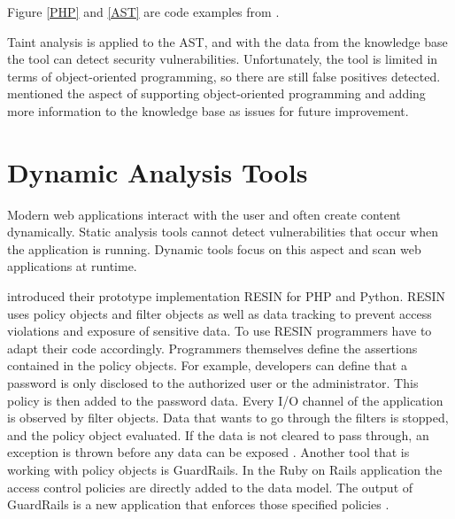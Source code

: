 Figure \ref{PHP} and \ref{AST} are code examples from \textcite[2-3]{Maskur2019}.

Taint analysis is applied to the AST, and with the data from the knowledge base the tool can detect security vulnerabilities. Unfortunately, the tool is limited in terms of object-oriented programming, so there are still false positives detected. \textcite[]{Maskur2019} mentioned the aspect of supporting object-oriented programming and adding more information to the knowledge base as issues for future improvement.




\section{Dynamic Analysis Tools}
Modern web applications interact with the user and often create content dynamically. Static analysis tools cannot detect vulnerabilities that occur when the application is running. Dynamic tools focus on this aspect and scan web applications at runtime.\newline


\textcite[]{Yip2009} introduced their prototype implementation RESIN for PHP and Python. RESIN uses policy objects and filter objects as well as data tracking to prevent access violations and exposure of sensitive data. To use RESIN programmers have to adapt their code accordingly. Programmers themselves define the assertions contained in the policy objects. For example, developers can define that a password is only disclosed to the authorized user or the administrator. This policy is then added to the password data. Every I/O channel of the application is observed by filter objects. Data that wants to go through the filters is stopped, and the policy object evaluated. If the data is not cleared to pass through, an exception is thrown before any data can be exposed \autocite[3-7]{Yip2009}. Another tool that is working with policy objects is GuardRails\autocite[]{Felt2011}. In the Ruby on Rails application the access control policies are directly added to the data model. The output of GuardRails is a new application that enforces those specified policies \autocite[2-4]{Felt2011}.\newline


